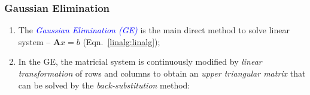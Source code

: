 \documentclass[10pt,compress]{beamer}
\begin{document}
\begin{frame}
  \frametitle{Gaussian Elimination} 
  \begin{enumerate}
     \item <1-> The \textcolor{blue}{\it Gaussian Elimination (GE)} is the main direct method to solve linear system -- $\bm{A}x=b$ (Eqn.~\ref{linalg:linalg});
     \item <2-> In the GE, the matricial system is continuously modified by {\it linear transformation} of rows and columns to obtain an {\it upper triangular matrix} that can be solved by the {\it back-substitution} method:


\end{enumerate}
\end{frame}
\end{document}
